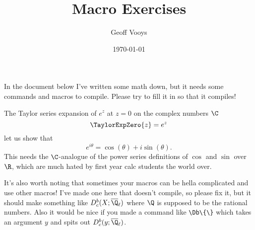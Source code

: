 \documentclass[10pt]{article}
\title{Macro Exercises}
\author{Geoff Vooys}
\date{\today}
\numberwithin{Theorem}{section}
\begin{document}
\maketitle

In the document below I've written some math down, but it needs some commands and macros to compile. Please try to fill it in so that it compiles!

The Taylor series expansion of $e^z$ at $z = 0$ on the complex numbers $\C$
\[
\TaylorExpZero{z} = e^z
\]
let us show that
\[
e^{i\theta} = \cos(\theta) + i \sin(\theta).
\]
This needs the $\C$-analogue of the power series definitions of $\cos$ and $\sin$ over $\R$, which are much hated by first year calc students the world over. 

It's also worth noting that sometimes your macros can be hella complicated and use other macros! I've made one here that doesn't compile, so please fix it, but it should make something like $D_c^b(X;\overline{\Q}_{\ell})$ where $\Q$ is supposed to be the rational numbers. Also it would be nice if you made a command like \verb|\Db\{\}| which takes an argument $y$ and spits out $D_c^b(y;\overline{\Q}_{\ell})$. 
\end{document}
